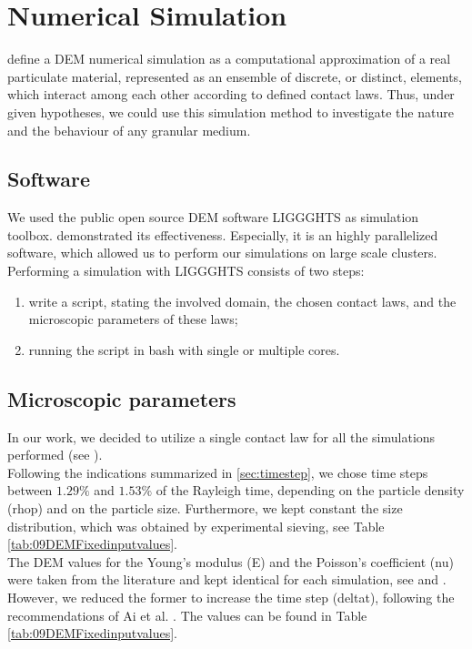 
\chapter{Numerical Simulation}
\label{cap:numericalsimulation}

\citet{RefWorks:172} define a \acs{DEM} numerical simulation as a computational
approximation of a real particulate material, represented as an ensemble of discrete, or distinct, elements, which
interact among each other according to defined contact laws.
Thus, under given hypotheses, we could use this simulation method to investigate
the nature and the behaviour of any granular medium.\\

\section{Software}
\label{sec:software}

We used the public open source \acs{DEM} software \acs{LIGGGHTS} as simulation toolbox.
\citet{RefWorks:136, RefWorks:206} demonstrated its effectiveness.
Especially, it is an highly parallelized software, which allowed us to perform
our simulations on large scale clusters.\\
Performing a simulation with \acs{LIGGGHTS} consists of two steps:
\begin{enumerate}
  \item{write a script, stating the involved domain, the chosen contact laws,
  and the microscopic parameters of these laws;}
  \item{running the script in bash with single or multiple cores.}
\end{enumerate}

\section{Microscopic parameters}
\label{sec:microscopicparameters}

In our work, we decided to utilize a single
contact law for all the simulations performed (see \citet{RefWorks:205}).\\
Following the indications summarized in \ref{sec:timestep}, we chose time
steps between $1.29 \%$ and $1.53 \%$ of the Rayleigh time, 
depending on the particle density (\acs{rhop}) and on the particle size.
Furthermore, we kept constant the size distribution, which was obtained by
experimental sieving, see Table \ref{tab:09DEMFixedinputvalues}.\\
The \acs{DEM} values for the Young's modulus (\acs{E}) and the Poisson's
coefficient (\acs{nu}) were taken from the literature and kept identical for
each simulation, see \cite{RefWorks:175} and \cite{RefWorks:176}. However, we
reduced the former to increase the time step (\acs{deltat}), following the recommendations of Ai et al.
\cite{RefWorks:131}.
The values can be found in Table \ref{tab:09DEMFixedinputvalues}.
\\

